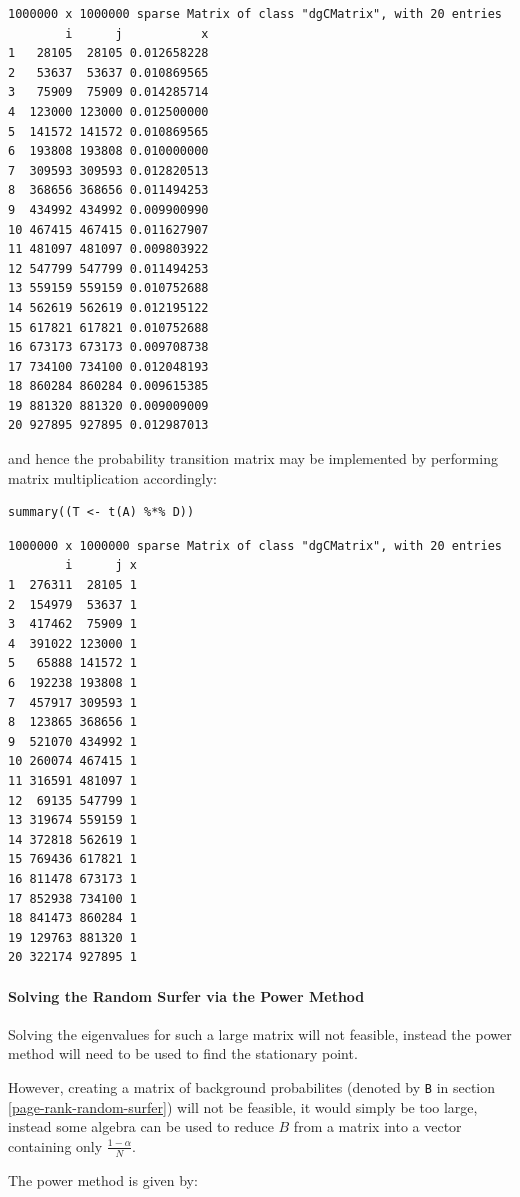 \documentclass[11pt]{article}
\begin{document}
\begin{verbatim}
1000000 x 1000000 sparse Matrix of class "dgCMatrix", with 20 entries
        i      j           x
1   28105  28105 0.012658228
2   53637  53637 0.010869565
3   75909  75909 0.014285714
4  123000 123000 0.012500000
5  141572 141572 0.010869565
6  193808 193808 0.010000000
7  309593 309593 0.012820513
8  368656 368656 0.011494253
9  434992 434992 0.009900990
10 467415 467415 0.011627907
11 481097 481097 0.009803922
12 547799 547799 0.011494253
13 559159 559159 0.010752688
14 562619 562619 0.012195122
15 617821 617821 0.010752688
16 673173 673173 0.009708738
17 734100 734100 0.012048193
18 860284 860284 0.009615385
19 881320 881320 0.009009009
20 927895 927895 0.012987013
\end{verbatim}

and hence the probability transition matrix may be implemented by performing matrix multiplication accordingly:

\begin{verbatim}
summary((T <- t(A) %*% D))
\end{verbatim}

\begin{verbatim}
1000000 x 1000000 sparse Matrix of class "dgCMatrix", with 20 entries
        i      j x
1  276311  28105 1
2  154979  53637 1
3  417462  75909 1
4  391022 123000 1
5   65888 141572 1
6  192238 193808 1
7  457917 309593 1
8  123865 368656 1
9  521070 434992 1
10 260074 467415 1
11 316591 481097 1
12  69135 547799 1
13 319674 559159 1
14 372818 562619 1
15 769436 617821 1
16 811478 673173 1
17 852938 734100 1
18 841473 860284 1
19 129763 881320 1
20 322174 927895 1
\end{verbatim}

\paragraph{Solving the Random Surfer via the Power Method}
\label{random-surfer-sparse-fix}
Solving the eigenvalues for such a large matrix will not feasible, instead the power method will need to be used to find the stationary point.

However, creating a matrix of background probabilites (denoted by \texttt{B} in section \ref{page-rank-random-surfer}) will not be feasible, it would simply be too large, instead some algebra can be used to reduce \(B\) from a matrix into a vector containing only \(\frac{1-\alpha}{N}\).

The power method is given by:
\end{document}
